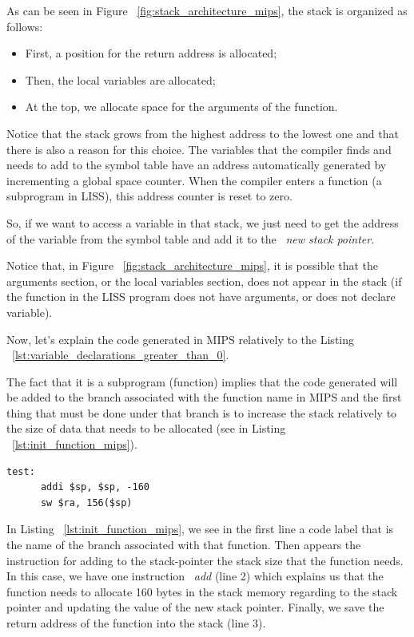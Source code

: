 \documentclass[
  oneside,
  11pt, a4paper,
  footinclude=true,
  headinclude=true,
  cleardoublepage=empty
]{scrbook}
\begin{document}
As can be seen in Figure ~\ref{fig:stack_architecture_mips}, the stack is organized as follows: 
\begin{itemize}
\item First, a position for the return address is allocated;
\item Then, the local variables are allocated;
\item At the top, we allocate space for the arguments of the function.
\end{itemize}

Notice that the stack grows from the highest address to the lowest one and that there is also a reason for this choice. The variables that the compiler finds and needs to add to the symbol table have an address automatically generated by incrementing a global space counter. When the compiler enters a function (a subprogram in LISS), this address counter is reset to zero. 

So, if we want to access a variable in that stack, we just need to get the address of the variable from the symbol table and add it to the ~\textit{new stack pointer}.

Notice that, in Figure ~\ref{fig:stack_architecture_mips}, it is possible that the arguments section, or the local variables section, does not appear in the stack (if the function in the LISS program does not have arguments, or does not declare variable).

Now, let's explain the code generated in MIPS relatively to the Listing ~\ref{lst:variable_declarations_greater_than_0}.

The fact that it is a subprogram (function) implies that the code generated will be added to the branch associated with the function name in MIPS and the first thing that must be done under that branch is to increase the stack relatively to the size of data that needs to be allocated (see in Listing ~\ref{lst:init_function_mips}).

\begin{lstlisting}[caption={Initialization of MIPS code generated for a function branch},label={lst:init_function_mips}]
    test: 
      addi $sp, $sp, -160		
      sw $ra, 156($sp)
\end{lstlisting}

In Listing ~\ref{lst:init_function_mips}, we see in the first line a code label that is the name of the branch associated with that function. Then appears the instruction for adding to the stack-pointer the stack size that the function needs. In this case, we have one instruction ~\textit{add} (line 2) which explains us that the function needs to allocate 160 bytes  in the stack memory regarding to the stack pointer and updating the value of the new stack pointer. Finally, we save the return address of the function into the stack (line 3).
\end{document}
